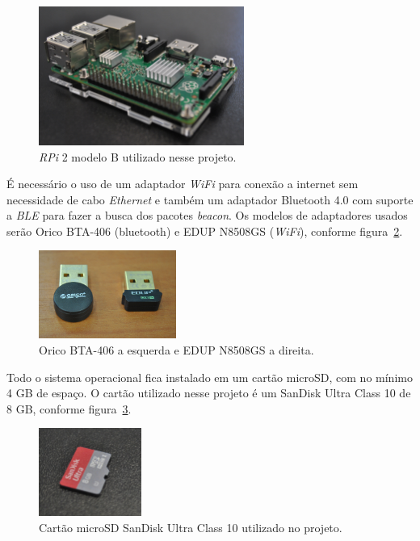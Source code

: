 \documentclass[
		12pt,				%
		openright,			%
		oneside,			%
		a4paper,			%
		chapter=TITLE,		%
		english,			%
		brazil				%
	]{abntex2}
\begin{document}
\begin{figure}[htb]
	\caption{\label{fig:rpi2-utilizado}\textit{RPi} 2 modelo B utilizado nesse projeto.}
	\begin{center}
		\includegraphics[width=0.6\textwidth]{img/rpi2.jpg}
	\end{center}
\end{figure}

É necessário o uso de um adaptador \textit{WiFi} para conexão a internet sem necessidade de cabo \textit{Ethernet} e também um adaptador Bluetooth 4.0 com suporte a \textit{BLE} para fazer a busca dos pacotes \textit{beacon}. Os modelos de adaptadores usados serão Orico BTA-406 (bluetooth) e EDUP N8508GS (\textit{WiFi}), conforme figura~\ref{fig:adaptadores}.

\begin{figure}[htb]
	\caption{\label{fig:adaptadores}Orico BTA-406 a esquerda e EDUP N8508GS a direita.}
	\begin{center}
		\includegraphics[width=0.4\textwidth]{img/adaptadores.jpg}
	\end{center}
\end{figure}

Todo o sistema operacional fica instalado em um cartão microSD, com no mínimo 4 GB de espaço. O cartão utilizado nesse projeto é um SanDisk Ultra Class 10 de 8 GB, conforme figura~\ref{fig:cartaomicrosd}.

\begin{figure}[htb]
	\caption{\label{fig:cartaomicrosd}Cartão microSD SanDisk Ultra Class 10 utilizado no projeto.}
	\begin{center}
		\includegraphics[width=0.3\textwidth]{img/cartaomicrosd.jpg}
	\end{center}
\end{figure}
\end{document}

